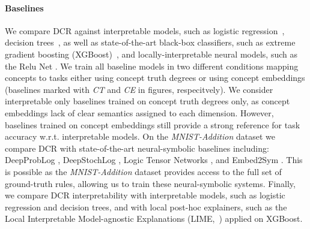 \paragraph{Baselines}
We compare DCR against interpretable models, such as logistic regression~\cite{verhulst1845resherches}, decision trees~\citep{breiman2017classification}, as well as state-of-the-art black-box classifiers, such as extreme gradient boosting (\mbox{XGBoost})~\citep{chen2016xgboost}, and locally-interpretable neural models, such as the Relu Net \citep{ciravegna2023logic}. 
We train all baseline models in two different conditions mapping concepts to tasks either using concept truth degrees or using concept embeddings (baselines marked with \emph{CT} and \emph{CE} in figures, respecitvely). We consider interpretable only baselines trained on concept truth degrees only, as concept embeddings lack of clear semantics assigned to each dimension. However, baselines trained on concept embeddings still provide a strong reference for task accuracy w.r.t. interpretable models.
On the \emph{MNIST-Addition} dataset we compare DCR with state-of-the-art neural-symbolic baselines including: DeepProbLog \cite{manhaeve2018deepproblog}, DeepStochLog \cite{winters2022deepstochlog}, Logic Tensor Networks \cite{badreddine2022logic}, and Embed2Sym \cite{aspis2022embed2sym}. This is possible as the \emph{MNIST-Addition} dataset provides access to the full set of ground-truth rules, allowing us to train these neural-symbolic systems.
Finally, we compare DCR interpretability with interpretable models, such as logistic regression and decision trees, and with local post-hoc explainers, such as the Local Interpretable Model-agnostic Explanations (LIME,~\cite{ribeiro2016should}) applied on XGBoost. 


